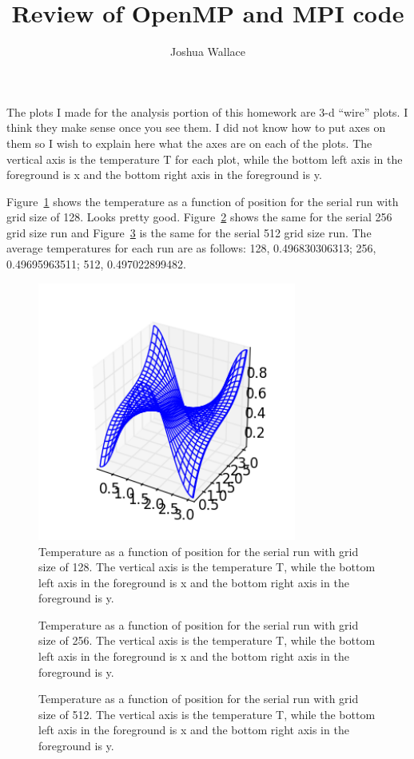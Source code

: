 \documentclass{article}
\begin{document}
\title{Review of OpenMP and MPI code}
\author{Joshua Wallace}

\maketitle

The plots I made for the analysis portion of this homework are 3-d ``wire'' plots.  I think they make sense once you see them.  I did not know how to put axes on them so I wish to explain here what the axes are on each of the plots.  The vertical axis is the temperature T for each plot, while the bottom left axis in the foreground is x and the bottom right axis in the foreground is y.

Figure~\ref{fig:1} shows the temperature as a function of position for the serial run with grid size of 128.  Looks pretty good.  Figure~\ref{fig:2} shows the same for the serial 256 grid size run and Figure~\ref{fig:3} is the same for the serial 512 grid size run.  The average temperatures for each run are as follows: 128, 0.496830306313; 256, 0.49695963511; 512, 0.497022899482.
\begin{figure}
\includegraphics[width=85mm]{serial_128.png}
\caption{\label{fig:1}Temperature as a function of position for the serial run with grid size of 128. The vertical axis is the temperature T, while the bottom left axis in the foreground is x and the bottom right axis in the foreground is y.}
\end{figure}
\begin{figure}
\caption{\label{fig:2}Temperature as a function of position for the serial run with grid size of 256. The vertical axis is the temperature T, while the bottom left axis in the foreground is x and the bottom right axis in the foreground is y.}
\end{figure}
\begin{figure}
\caption{\label{fig:3}Temperature as a function of position for the serial run with grid size of 512. The vertical axis is the temperature T, while the bottom left axis in the foreground is x and the bottom right axis in the foreground is y.}
\end{figure}
\end{document}
